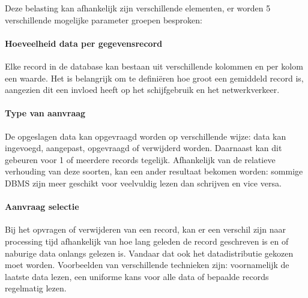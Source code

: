 \begin{figure}[h!] 
\centering
	\hfill
	\caption{}
\end{figure}

Deze belasting kan afhankelijk zijn verschillende elementen, er worden 5 verschillende mogelijke parameter groepen besproken:

\paragraph{Hoeveelheid data per gegevensrecord} Elke record in de database kan bestaan uit verschillende kolommen en per kolom een waarde. Het is belangrijk om te definiëren hoe groot een gemiddeld record is, aangezien dit een invloed heeft op het schijfgebruik en het netwerkverkeer.   

\paragraph{Type van aanvraag} De opgeslagen data kan opgevraagd worden op verschillende wijze: data kan ingevoegd, aangepast, opgevraagd of verwijderd worden. Daarnaast kan dit gebeuren voor 1 of meerdere records tegelijk. Afhankelijk van de relatieve verhouding van deze soorten, kan een ander resultaat bekomen worden: sommige DBMS zijn meer geschikt voor veelvuldig lezen dan schrijven en vice versa. 

\paragraph{Aanvraag selectie} Bij het opvragen of verwijderen van een record, kan er een verschil zijn naar processing tijd afhankelijk van hoe lang geleden de record geschreven is en of naburige data onlangs gelezen is. Vandaar dat ook het datadistributie gekozen moet worden. Voorbeelden van verschillende technieken zijn: voornamelijk de laatste data lezen, een uniforme kans voor alle data of bepaalde records regelmatig lezen.

